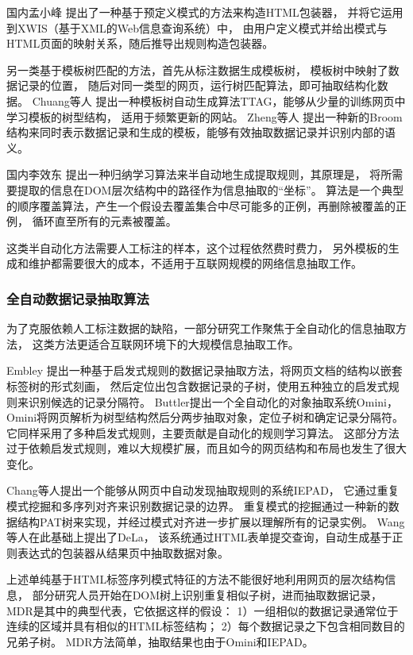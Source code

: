国内孟小峰
提出了一种基于预定义模式的方法来构造HTML包装器，
并将它运用到XWIS（基于XML的Web信息查询系统）中，
由用户定义模式并给出模式与HTML页面的映射关系，随后推导出规则构造包装器。

另一类基于模板树匹配的方法，首先从标注数据生成模板树，
模板树中映射了数据记录的位置，
随后对同一类型的网页，运行树匹配算法，即可抽取结构化数据。
Chuang等人
提出一种模板树自动生成算法TTAG，能够从少量的训练网页中学习模板的树型结构，
适用于频繁更新的网站。
Zheng等人
提出一种新的Broom结构来同时表示数据记录和生成的模板，能够有效抽取数据记录并识别内部的语义。

国内李效东
提出一种归纳学习算法来半自动地生成提取规则，其原理是，
将所需要提取的信息在DOM层次结构中的路径作为信息抽取的“坐标”。
算法是一个典型的顺序覆盖算法，产生一个假设去覆盖集合中尽可能多的正例，再删除被覆盖的正例，
循环直至所有的元素被覆盖。

这类半自动化方法需要人工标注的样本，这个过程依然费时费力，
另外模板的生成和维护都需要很大的成本，不适用于互联网规模的网络信息抽取工作。

\subsubsection{全自动数据记录抽取算法}

为了克服依赖人工标注数据的缺陷，一部分研究工作聚焦于全自动化的信息抽取方法，
这类方法更适合互联网环境下的大规模信息抽取工作。

Embley
提出一种基于启发式规则的数据记录抽取方法，将网页文档的结构以嵌套标签树的形式刻画，
然后定位出包含数据记录的子树，使用五种独立的启发式规则来识别候选的记录分隔符。
Buttler提出一个全自动化的对象抽取系统Omini，
Omini将网页解析为树型结构然后分两步抽取对象，定位子树和确定记录分隔符。
它同样采用了多种启发式规则，主要贡献是自动化的规则学习算法。
这部分方法过于依赖启发式规则，难以大规模扩展，而且如今的网页结构和布局也发生了很大变化。

Chang等人提出一个能够从网页中自动发现抽取规则的系统IEPAD，
它通过重复模式挖掘和多序列对齐来识别数据记录的边界。
重复模式的挖掘通过一种新的数据结构PAT树来实现，并经过模式对齐进一步扩展以理解所有的记录实例。
Wang等人在此基础上提出了DeLa，
该系统通过HTML表单提交查询，自动生成基于正则表达式的包装器从结果页中抽取数据对象。

上述单纯基于HTML标签序列模式特征的方法不能很好地利用网页的层次结构信息，
部分研究人员开始在DOM树上识别重复相似子树，进而抽取数据记录，
MDR是其中的典型代表，它依据这样的假设：
1）一组相似的数据记录通常位于连续的区域并具有相似的HTML标签结构；
2）每个数据记录之下包含相同数目的兄弟子树。
MDR方法简单，抽取结果也由于Omini和IEPAD。

